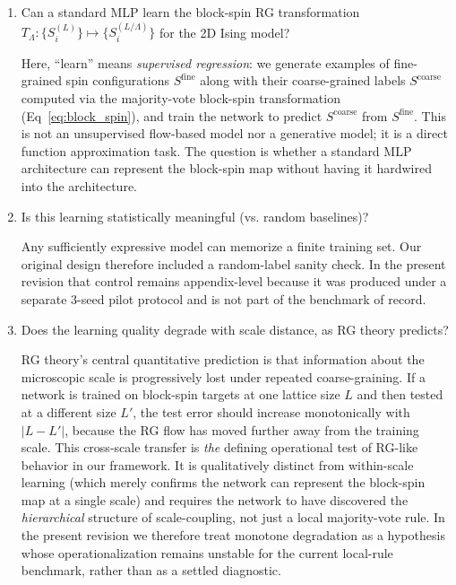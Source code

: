 \documentclass[12pt,a4paper]{memoir}
\begin{document}
\begin{enumerate}
    \item Can a standard MLP learn the block-spin RG transformation
        $T_\Lambda: \{S_i^{(L)}\} \mapsto \{S_i^{(L/\Lambda)}\}$ for the 2D Ising model?

        Here, ``learn'' means \emph{supervised regression}: we generate examples
        of fine-grained spin configurations $S^{\mathrm{fine}}$ along with their
        coarse-grained labels $S^{\mathrm{coarse}}$ computed via the majority-vote
        block-spin transformation (Eq~\ref{eq:block_spin}), and train the network
        to predict $S^{\mathrm{coarse}}$ from $S^{\mathrm{fine}}$.  This is not an
        unsupervised flow-based model nor a generative model; it is a direct
        function approximation task.  The question is whether a standard MLP
        architecture can represent the block-spin map without having it hardwired
        into the architecture.

    \item Is this learning statistically meaningful (vs. random baselines)?

        Any sufficiently expressive model can memorize a finite training set.
        Our original design therefore included a random-label sanity check.
        In the present revision that control remains appendix-level because it
        was produced under a separate 3-seed pilot protocol and is not part of
        the benchmark of record.

    \item Does the learning quality degrade with scale distance, as RG theory predicts?

        RG theory's central quantitative prediction is that information about
        the microscopic scale is progressively lost under repeated coarse-graining.
        If a network is trained on block-spin targets at one lattice size $L$
        and then tested at a different size $L'$, the test error should increase
        monotonically with $|L - L'|$, because the RG flow has moved further
        away from the training scale.  This cross-scale transfer is \emph{the}
        defining operational test of RG-like behavior in our framework.  It is
        qualitatively distinct from within-scale learning (which merely confirms
        the network can represent the block-spin map at a single scale) and
        requires the network to have discovered the \emph{hierarchical}
        structure of scale-coupling, not just a local majority-vote rule.  In
        the present revision we therefore treat monotone degradation as a
        hypothesis whose operationalization remains unstable for the current
        local-rule benchmark, rather than as a settled diagnostic.


\end{enumerate}
\end{document}
